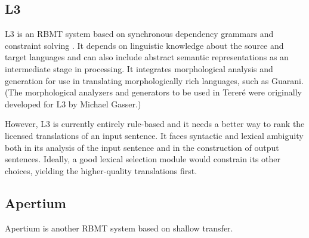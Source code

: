 \subsection{L3}
L3 is an RBMT system based on synchronous dependency grammars and constraint
solving \cite{gasser:sxdg,gasser:aflat2012}.
It depends on linguistic knowledge about the source and target languages and
can also include abstract semantic representations as an intermediate stage in
processing. It integrates morphological analysis and generation for use in
translating morphologically rich languages, such as Guarani.
(The morphological analyzers and generators to be used in Tereré were
originally developed for L3 by Michael Gasser.)

However, L3 is currently entirely rule-based and it needs a better way to rank
the licensed translations of an input sentence. It faces syntactic and lexical
ambiguity both in its analysis of the input sentence and in the construction of
output sentences. Ideally, a good lexical selection module would constrain its
other choices, yielding the higher-quality translations first.

\subsection{Apertium}
Apertium is another RBMT system based on shallow transfer.

\cite{Forcada_theapertium}
